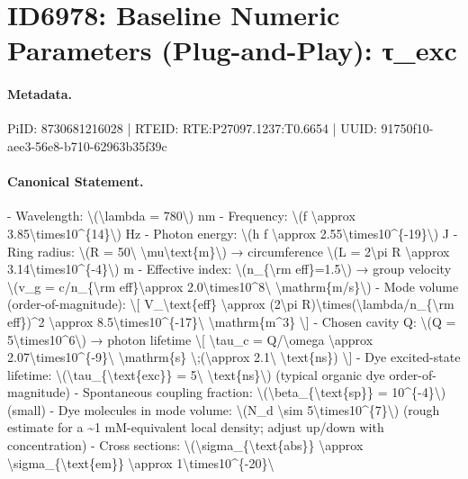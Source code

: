 \section*{ID6978: Baseline Numeric Parameters (Plug-and-Play): τ\_exc}
\paragraph{Metadata.}
PiID: 8730681216028 | RTEID: RTE:P27097.1237:T0.6654 | UUID: 91750f10-aee3-56e8-b710-62963b35f39c

\paragraph{Canonical Statement.}
- Wavelength: \textbackslash{}(\textbackslash{}lambda = 780\textbackslash{}) nm - Frequency: \textbackslash{}(f \textbackslash{}approx 3.85\textbackslash{}times10\textasciicircum{}\{14\}\textbackslash{}) Hz - Photon energy: \textbackslash{}(h f \textbackslash{}approx 2.55\textbackslash{}times10\textasciicircum{}\{-19\}\textbackslash{}) J - Ring radius: \textbackslash{}(R = 50\textbackslash{} \textbackslash{}mu\textbackslash{}text\{m\}\textbackslash{}) → circumference \textbackslash{}(L = 2\textbackslash{}pi R \textbackslash{}approx 3.14\textbackslash{}times10\textasciicircum{}\{-4\}\textbackslash{}) m - Effective index: \textbackslash{}(n\_\{\textbackslash{}rm eff\}=1.5\textbackslash{}) → group velocity \textbackslash{}(v\_g = c/n\_\{\textbackslash{}rm eff\}\textbackslash{}approx 2.0\textbackslash{}times10\textasciicircum{}8\textbackslash{} \textbackslash{}mathrm\{m/s\}\textbackslash{}) - Mode volume (order-of-magnitude): \textbackslash{}[ V\_\textbackslash{}text\{eff\} \textbackslash{}approx (2\textbackslash{}pi R)\textbackslash{}times(\textbackslash{}lambda/n\_\{\textbackslash{}rm eff\})\textasciicircum{}2 \textbackslash{}approx 8.5\textbackslash{}times10\textasciicircum{}\{-17\}\textbackslash{} \textbackslash{}mathrm\{m\textasciicircum{}3\} \textbackslash{}] - Chosen cavity Q: \textbackslash{}(Q = 5\textbackslash{}times10\textasciicircum{}6\textbackslash{}) → photon lifetime \textbackslash{}[ \textbackslash{}tau\_c = Q/\textbackslash{}omega \textbackslash{}approx 2.07\textbackslash{}times10\textasciicircum{}\{-9\}\textbackslash{} \textbackslash{}mathrm\{s\} \textbackslash{};(\textbackslash{}approx 2.1\textbackslash{} \textbackslash{}text\{ns\}) \textbackslash{}] - Dye excited-state lifetime: \textbackslash{}(\textbackslash{}tau\_\{\textbackslash{}text\{exc\}\} = 5\textbackslash{} \textbackslash{}text\{ns\}\textbackslash{}) (typical organic dye order-of-magnitude) - Spontaneous coupling fraction: \textbackslash{}(\textbackslash{}beta\_\{\textbackslash{}text\{sp\}\} = 10\textasciicircum{}\{-4\}\textbackslash{}) (small) - Dye molecules in mode volume: \textbackslash{}(N\_d \textbackslash{}sim 5\textbackslash{}times10\textasciicircum{}\{7\}\textbackslash{}) (rough estimate for a \textasciitilde{}1 mM-equivalent local density; adjust up/down with concentration) - Cross sections: \textbackslash{}(\textbackslash{}sigma\_\{\textbackslash{}text\{abs\}\} \textbackslash{}approx \textbackslash{}sigma\_\{\textbackslash{}text\{em\}\} \textbackslash{}approx 1\textbackslash{}times10\textasciicircum{}\{-20\}\textbackslash{} 